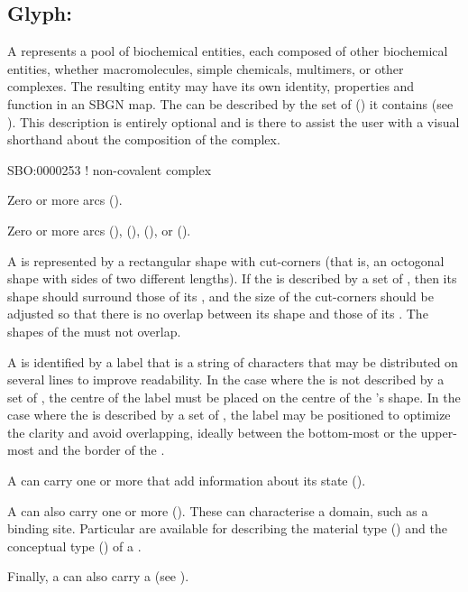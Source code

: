 \subsection{Glyph: }\label{sec:complex}

A  represents a pool of biochemical entities, each composed of other biochemical entities, whether macromolecules, simple chemicals, multimers, or other complexes. The resulting entity may have its own identity, properties and function in an SBGN map.
The  can be described by the set of  () it contains (see ). This description is entirely optional and is there to assist the user with a visual shorthand about the composition of the complex.

\begin{glyphDescription}

\glyphSboTerm
SBO:0000253 ! non-covalent complex

\glyphIncoming
Zero or more  arcs ().

\glyphOutgoing
Zero or more  arcs (),  (),  (), or  ().

\glyphContainer

A  is represented by a rectangular shape with cut-corners (that is, an octogonal shape with sides of two different lengths).
If the  is described by a set of , then its shape should surround those of its , and the size of the cut-corners should be adjusted so that there is no overlap between its shape and those of its .
The shapes of the  must not overlap.

\glyphLabel
A  is identified by a label that is  a string of characters that may be distributed on several lines to improve readability.
In the case where the  is not described by a set of , the centre of the label must be placed on the centre of the 's shape.
In the case where the  is described by a set of , the label may be positioned to optimize the clarity and avoid overlapping, ideally between the bottom-most or the upper-most  and the border of the .

\glyphAux
A  can carry one or more  that add information about its state ().

A  can also carry one or more  ().
These can characterise a domain, such as a binding site.
Particular  are available for describing the material type () and the conceptual type () of a .

Finally, a  can also carry a  (see ).

\end{glyphDescription}

